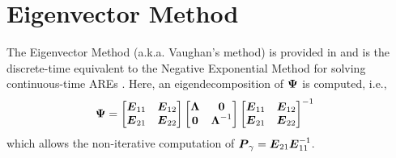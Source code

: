 \section{Eigenvector Method}
\label{appendix:numerical:eigenvector}
The Eigenvector Method (a.k.a. Vaughan's method) is provided in \cite{vaughan1970nonrecursive} and is the discrete-time equivalent to the Negative Exponential Method for solving continuous-time AREs \cite{vaughan1969negative}.  Here, an eigendecomposition of $\vb*{\Psi}$ is computed, i.e.,
\begin{equation}
\begin{aligned}
	\vb*{\Psi} &=
	\begin{bmatrix}
		\vb*{E}_{11} & \vb*{E}_{12}\\
		\vb*{E}_{21} & \vb*{E}_{22}\\
	\end{bmatrix}
	\begin{bmatrix}
		\vb*{\Lambda} & \vb*{0}\\
		\vb*{0} & \vb*{\Lambda}^{-1}\\
	\end{bmatrix}
	\begin{bmatrix}
		\vb*{E}_{11} & \vb*{E}_{12}\\
		\vb*{E}_{21} & \vb*{E}_{22}\\
	\end{bmatrix}^{-1}
\end{aligned}
\end{equation}
which allows the non-iterative computation of $\vb*{P}_{\gamma} = \vb*{E}_{21}\vb*{E}_{11}^{-1}$.

